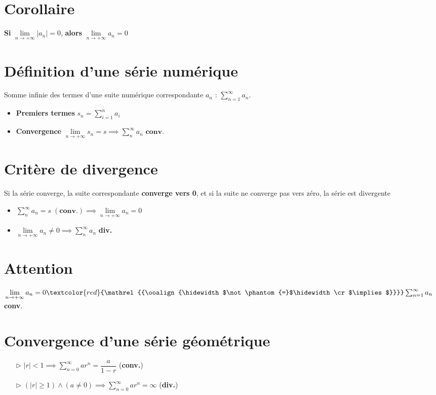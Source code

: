 \documentclass{report}
\newcommand{\notimplies}{%
  \mathrel{{\ooalign{\hidewidth$\not\phantom{=}$\hidewidth\cr$\implies$}}}}
\begin{document}
\begin{multicols*}{3}
    \section{Corollaire}
         \textbf{Si} $\lim\limits_{n\to+\infty }|a_n|  = 0$, 
         \textbf{alors}      
         $\lim\limits_{n\to+\infty }a_n  = 0$

    \section{Définition d'une série numérique}
    Somme infinie des termes d'une suite numérique 
    correspondante $a_n$ : 
    $\sum_{n=1}^{\infty}a_n$. 
    \begin{itemize}
        \item \textbf{Premiers termes} $s_n = \sum_{i=1}^{n } a_i$   
        \item \textbf{Convergence}   
        $\lim\limits_{n\to+\infty }s_n  = s \implies 
        \sum_{n}^{\infty}a_n \textbf{ conv.}$
    \end{itemize}



    \section{Critère de divergence}
        Si la série converge, la suite correspondante 
        \textbf{converge vers 0},
        et si la suite ne converge pas vers zéro, la série 
            est divergente
        \begin{itemize} 
            \item $\sum_ {n}^{ \infty }a_n = s \; (\textbf{conv.}) 
                \implies 
            \lim\limits_{n\to+\infty }a_n  = 0$
            \item
            $\lim\limits_{n\to+\infty }a_n  \neq 0  
            \implies 
            \sum_{ n}^{\infty }a_n$ \textbf{ div.}  
        \end{itemize}

    \section{Attention} 
    $\lim\limits_{n\to+\infty }a_n = 0 
    \textcolor{red}{\notimplies} 
    \sum_{n=1}^{\infty }a_n$ \textbf{conv}.   



    \section{Convergence d'une série géométrique}
    \begin{itemize}
        \item[$\rhd$] 
            $|r| < 1 \implies  
            \sum_{n=0}^{\infty }ar^{n} = 
            \dfrac{a}{1 - r} $ \;\;(\textbf{conv.})  
        \item [$\rhd$] 
            $(|r| \geq 1) \land (a \neq 0) \implies 
            \sum_{n=0}^{\infty }ar^{n} = \infty$ 
            (\textbf{div.})
        

\end{itemize}
\end{multicols*}
\end{document}
